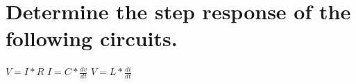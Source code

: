 \documentclass[main.tex]{subfiles}
\begin{document}
\section{Determine the step response of the following circuits.}

$V = I * R$
$I = C * \frac{dv}{dt}$
$V = L * \frac{di}{dt}$





\end{document}

